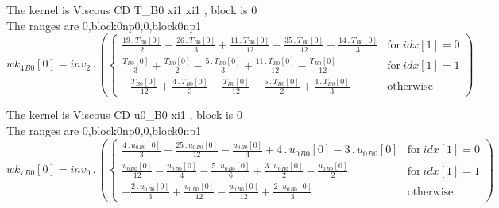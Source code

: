 \documentclass{article}
\begin{document}
\noindent The kernel is Viscous CD T_B0 xi1 xi1 , block is 0\\\noindent The ranges are 0,block0np0,0,block0np1\\\begin{dmath}{wk_{4}{_{B0}}}[{0}] = inv_2 \,.\, \left(\begin{cases} \frac{19 \,.\, {T{_{B0}}}[{0}]}{2} - \frac{26 \,.\, {T{_{B0}}}[{0}]}{3} + \frac{11 \,.\, {T{_{B0}}}[{0}]}{12} + \frac{35 \,.\, {T{_{B0}}}[{0}]}{12} - \frac{14 \,.\, 
{T{_{B0}}}[{0}]}{3} & \text{for}\: {idx}[{1}] = 0 \\\frac{{T{_{B0}}}[{0}]}{3} + \frac{{T{_{B0}}}[{0}]}{2} - \frac{5 \,.\, {T{_{B0}}}[{0}]}{3} + \frac{11 \,.\, {T{_{B0}}}[{0}]}{12} - \frac{{T{_{B0}}}[{0}]}{12} & \text{for}\: {idx}[{1}] = 1 \\- 
\frac{{T{_{B0}}}[{0}]}{12} + \frac{4 \,.\, {T{_{B0}}}[{0}]}{3} - \frac{{T{_{B0}}}[{0}]}{12} - \frac{5 \,.\, {T{_{B0}}}[{0}]}{2} + \frac{4 \,.\, {T{_{B0}}}[{0}]}{3} & \text{otherwise} \end{cases}\right)\end{dmath}

\noindent The kernel is Viscous CD u0_B0 xi1 , block is 0\\\noindent The ranges are 0,block0np0,0,block0np1\\\begin{dmath}{wk_{7}{_{B0}}}[{0}] = inv_0 \,.\, \left(\begin{cases} \frac{4 \,.\, {u_{0}{_{B0}}}[{0}]}{3} - \frac{25 \,.\, {u_{0}{_{B0}}}[{0}]}{12} - \frac{{u_{0}{_{B0}}}[{0}]}{4} + 4 \,.\, {u_{0}{_{B0}}}[{0}] - 3 \,.\, {u_{0}{_{B0}}}[{0}] & 
\text{for}\: {idx}[{1}] = 0 \\\frac{{u_{0}{_{B0}}}[{0}]}{12} - \frac{{u_{0}{_{B0}}}[{0}]}{4} - \frac{5 \,.\, {u_{0}{_{B0}}}[{0}]}{6} + \frac{3 \,.\, {u_{0}{_{B0}}}[{0}]}{2} - \frac{{u_{0}{_{B0}}}[{0}]}{2} & \text{for}\: {idx}[{1}] = 1 \\- \frac{2 
\,.\, {u_{0}{_{B0}}}[{0}]}{3} + \frac{{u_{0}{_{B0}}}[{0}]}{12} - \frac{{u_{0}{_{B0}}}[{0}]}{12} + \frac{2 \,.\, {u_{0}{_{B0}}}[{0}]}{3} & \text{otherwise} \end{cases}\right)\end{dmath}
\end{document}
